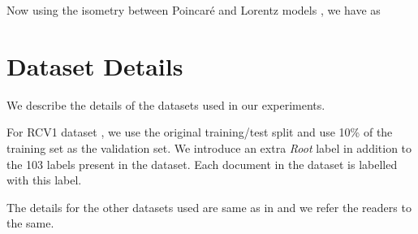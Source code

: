 \documentclass[11pt,a4paper]{article}
\begin{document}
Now using the isometry between Poincar\'e and Lorentz models \citep{lorentz}, we have  as 


\section{Dataset Details}
We describe the details of the datasets used in our experiments.

For RCV1 dataset \citep{rcv1}, we use the original training/test split and use 10\% of the training set as the validation set. We introduce an extra \textit{Root} label in addition to the 103 labels present in the dataset. Each document in the dataset is labelled with this label.

The details for the other datasets used are same as in \citet{emnlp} and we refer the readers to the same.
\end{document}
